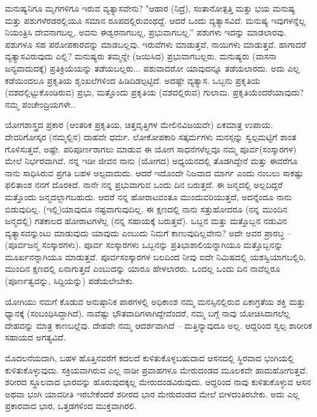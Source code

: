 ಮನುಷ್ಯನಿಗೂ ಮೃಗಗಳಿಗೂ ಇರುವ ವ್ಯತ್ಯಾಸವೇನು? "ಆಹಾರ (ನಿದ್ರೆ), ಸಂತಾನೋತ್ಪತ್ತಿ ಮತ್ತು ಭಯ ಮನುಷ್ಯ ಮತ್ತು ಪಶುಗಳೆರಡರಲ್ಲಿಯೂ ಸಮಾನ ರೂಪದಲ್ಲಿರುವಂಥದ್ದೆ. ಆದರೆ ಒಂದು ವ್ಯತ್ಯಾಸವಿದೆ. ಮನುಷ್ಯ ಇವುಗಳನ್ನೆಲ್ಲ ನಿಯಂತ್ರಿಸಿ ದೇವನಾಗಬಲ್ಲ, ಅವನು ಈಶ್ವರನಾಗಬಲ್ಲ, ಪ್ರಭುವಾಗಬಲ್ಲ.'' ಪಶುಗಳು ಇದನ್ನು ಮಾಡಲಾರವು. ಪಶುಗಳೂ ಸಹ ಪರೋಪಕಾರವನ್ನು ಮಾಡಬಲ್ಲವು. ಇರುವೆಗಳು ಮಾಡುತ್ತವೆ, ನಾಯಿಗಳು ಮಾಡುತ್ತವೆ. ಹಾಗಾದರೆ ವ್ಯತ್ಯಾಸವಿರುವುದು ಎಲ್ಲಿ? ಮನುಷ್ಯರು ತಮ್ಮನ್ನೇ (ಜಯಿಸಿದ) ಪ್ರಭುವಾಗಬಲ್ಲರು. ಮನುಷ್ಯರು (ವಾಸನಾ ಜನ್ಯವಾದುದಕ್ಕೆ) ಪ್ರತಿಕ್ರಿಯೆಯನ್ನು ತಡೆಯಬಲ್ಲರು... ಪಶುವಾದರೋ ಯಾವುದನ್ನೂ ತಡೆಯಲಾರದು. ಅದು ಎಲ್ಲ ಕಡೆಯಿಂದಲೂ ಪ್ರಕೃತಿಯ ಶೃಂಖಲೆಗಳಿಂದ ಹಿಡಿದಿಡಲ್ಪಟ್ಟಿದೆ. ಅದಷ್ಟೇ ವ್ಯತ್ಯಾಸ. ಒಬ್ಬನು ಪ್ರಕೃತಿಯ (ವಶದಲ್ಲಿಟ್ಟುಕೊಂಡಿರುವ) ಪ್ರಭು, ಮತ್ತೊಂದು ಪ್ರಕೃತಿಯ (ವಶದಲ್ಲಿರುವ) ಗುಲಾಮ. ಪ್ರಕೃತಿಯೆಂದರೆ\break ಯಾವುದು? ನಮ್ಮ ಪಂಚೇಂದ್ರಿಯಗಳೇ..

ಯೋಗಶಾಸ್ತ್ರದ ಪ್ರಕಾರ (ಆಂತರಿಕ ಪ್ರಕೃತಿಯ, ಚಿತ್ತವೃತ್ತಿಗಳ ಮೇಲಿನ\break ವಿಜಯವೇ) ಏಕಮಾತ್ರ ಉಪಾಯ. ದೇವರಿಗೋಸ್ಕರ (ನಮ್ಮಲ್ಲಿನ) ದಾಹವೇ ಧರ್ಮ. ಲೋಕೋಪಕಾರಿ ಸತ್ಕರ್ಮಗಳು ಮನಸ್ಸನ್ನು ಸ್ವಲ್ಪಮಟ್ಟಿಗೆ ಶಾಂತ ಗೊಳಿಸುತ್ತವೆ, ಅಷ್ಟೇ. ಪರಿಪೂರ್ಣರಾಗಲು ಮಾಡುವ ಈ ಯೋಗ ಸಾಧನೆಗಳೆಲ್ಲವೂ ನಮ್ಮ ಪೂರ್ವ\break (ಸಂಸ್ಕಾರಗಳ) ಮೇಲೆ ನಿರ್ಭರವಾಗಿವೆ. ನನ್ನ ಇಡೀ ಜೀವನ ನಾನು (ಯೋಗದ) ಅಧ್ಯಯನದಲ್ಲಿ ತೊಡಗಿದ್ದೇನೆ ಮತ್ತು ಈವರೆಗೂ ನಾನು ಸಾಧಿಸಿರುವ ಪ್ರಗತಿ ಬಹಳ ಅಲ್ಪವಾದುದು. ಆದರೆ ಇದೊಂದೇ ನಿಜವಾದ ಮಾರ್ಗ ಎಂದು ನಂಬಲು ಸಾಕಷ್ಟು ಫಲಿತಾಂಶ ನನಗೆ ದೊರಕಿದೆ. ನಾನೇ ನನ್ನ ಪ್ರಭುವಾಗುವ ಒಂದು ದಿನ ಬರುತ್ತದೆ. ಈ ಜನ್ಮದಲ್ಲಿ ಅಲ್ಲದಿದ್ದರೆ ಮತ್ತೊಂದು ಜನ್ಮದಲ್ಲಾಗಬಹುದು. ಆದರೆ ನನ್ನ ಹೋರಾಟವಂತೂ ಮುಂದುವರಿಯುತ್ತದೆ, ಅದನ್ನೆಂದೂ ನಾನು ಬಿಡುವುದಿಲ್ಲ. (ಇಲ್ಲಿ)\break ಯಾವುದೂ ನಷ್ಟವಾಗುವುದಿಲ್ಲ. ಈ ಕ್ಷಣದಲ್ಲಿ ನಾನು ಸತ್ತುಹೋದರೂ (ನನ್ನ ಮುಂದಿನ ಜನ್ಮದಲ್ಲಿ) ಗತಕಾಲದ ಹೋರಾಟಗಳೆಲ್ಲ (ನನ್ನ ಸಹಾಯಕ್ಕೆ ಬರುತ್ತವೆ). ಒಬ್ಬನ ಮತ್ತು ಮತ್ತೊಬ್ಬನ ನಡುವಿನ ವ್ಯತ್ಯಾಸವನ್ನುಂಟು ಮಾಡುವುದು ಯಾವುದು ಎಂಬುದು ನಿಮಗೆ ಕಾಣುವುದಿಲ್ಲವೇನು? ಅದೇ ಅವರ ಪ್ರಾರಬ್ಧ – (ಪೂರ್ವಜನ್ಮ ಸಂಸ್ಕಾರಗಳು). ಪೂರ್ವ ಸಂಸ್ಕಾರಗಳು ಒಬ್ಬನನ್ನು ಪ್ರತಿಭಾಶಾಲಿಯನ್ನಾಗಿಯೂ ಮತ್ತೊಬ್ಬನನ್ನು ಮೂರ್ಖನನ್ನಾಗಿಯೂ ಮಾಡುತ್ತವೆ. ಪೂರ್ವಸಂಸ್ಕಾರಗಳ ಬಲದಿಂದ ನೀವು ಐದೇ ನಿಮಿಷದಲ್ಲಿ ಯಶಸ್ವಿಯಾಗಬಲ್ಲಿರಿ. ಮುಂದಿನ ಕ್ಷಣದಲ್ಲಿ ಏನಾಗುತ್ತದೆ ಎಂಬುದನ್ನು ಯಾರೂ ಹೇಳಲಾರರು. ಒಂದಲ್ಲ ಒಂದು ದಿನ ನಾವೆಲ್ಲರೂ (ಪೂರ್ಣತ್ವವನ್ನು, ಸಿದ್ದಿಯನ್ನು) ಪಡೆಯಲೇಬೇಕು.

ಯೋಗಿಯು ನಮಗೆ ಕೊಡುವ ಅನುಷ್ಠಾನಿಕ ಪಾಠಗಳಲ್ಲಿ ಅಧಿಕಾಂಶ ನಮ್ಮ ಮನಸ್ಸಿನಲ್ಲಿರುವ ಏಕಾಗ್ರತೆಯ ಶಕ್ತಿ ಮತ್ತು ಧ್ಯಾನಕ್ಕೆ (ಸಂಬಂಧಿಸಿದ್ದಾಗಿದೆ). ನಾವೆಷ್ಟು ಭೌತವಾದಿಗಳಾಗಿದ್ದೇವೆಂದರೆ, ನಮ್ಮ ಬಗ್ಗೆ ನಾವು ಯೋಚಿಸಿದಾಗಲೆಲ್ಲ ದೇಹವನ್ನು ಮಾತ್ರ ಕಾಣಬಲ್ಲೆವು. ದೇಹವೇ ನಮ್ಮ ಆದರ್ಶವಾಗಿದೆ – ಮತ್ತಿನ್ಯಾವುದೂ ಅಲ್ಲ. ಆದ್ದರಿಂದ ಸ್ವಲ್ಪ ಶಾರೀರಿಕ ಸಹಾಯದ ಅಗತ್ಯವಿದೆ.

ಮೊದಲನೆಯದಾಗಿ, ಬಹಳ ಹೊತ್ತಿನವರೆಗೆ ಕದಲದೆ ಕುಳಿತುಕೊಳ್ಳಬಹುದಾದ ಆಸನದಲ್ಲಿ ಸ್ಥಿರವಾದ ಭಂಗಿಯಲ್ಲಿ ಕುಳಿತುಕೊಳ್ಳುವುದು. ಸಕ್ರಿಯವಾಗಿರುವ ಎಲ್ಲ ನಾಡೀ ಪ್ರವಾಹಗಳೂ ಮೇರುದಂಡದ ಮೂಲಕವೇ ಹಾದುಹೋಗುತ್ತವೆ. ಶರೀರದ ಸ್ಥೂಲವಾದ ಭಾರವನ್ನು ಹೊರುವುದಕ್ಕಲ್ಲ ಮೇರುದಂಡವಿರುವುದು. ಆದ್ದರಿಂದ ನಾವು ಕುಳಿತುಕೊಳ್ಳುವ ಆಸನ ಅಥವಾ ಭಂಗಿ ಯಾವರೀತಿ ಇರಬೇಕೆಂದರೆ ಶರೀರದ ಭಾರ ಮೇರುದಂಡದ ಮೇಲೆ ಬೀಳದಂತಿರಬೇಕು. ಅದು ಎಲ್ಲ ಪ್ರಕಾರವಾದ ಭಾರ, ಒತ್ತಡಗಳಿಂದ ಮುಕ್ತವಾಗಿರಲಿ.

